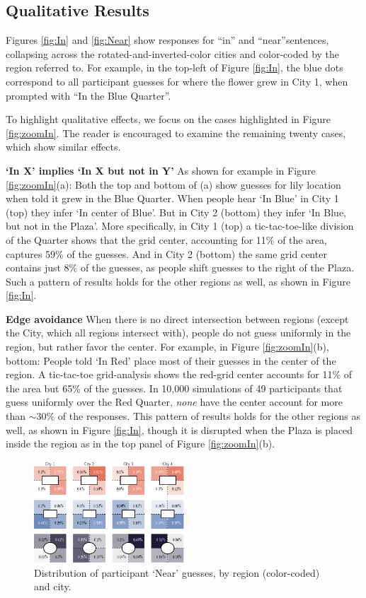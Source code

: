 \documentclass[10pt,letterpaper]{article}
\begin{document}
\subsection{Qualitative Results} 

Figures \ref{fig:In} and \ref{fig:Near} show responses for ``in'' and ``near''sentences, collapsing across the rotated-and-inverted-color cities and color-coded by the region referred to. For example, in the top-left of Figure \ref{fig:In}, the blue dots correspond to all participant guesses for where the flower grew in City 1, when prompted with ``In the Blue Quarter''. 

To highlight qualitative effects, we focus on the cases highlighted in Figure \ref{fig:zoomIn}. The reader is encouraged to examine the remaining twenty cases, which show similar effects. 

\textbf{`In X' implies `In X but not in Y'} As shown for example in Figure \ref{fig:zoomIn}(a): Both the top and bottom of (a) show guesses for lily location when told it grew in the Blue Quarter. When people hear `In Blue' in City 1 (top) they infer `In center of Blue'. But in City 2 (bottom) they infer `In Blue, but not in the Plaza'. More specifically, in City 1 (top) a tic-tac-toe-like division of the Quarter shows that the grid center, accounting for 11\% of the area, captures 59\% of the guesses. And in City 2 (bottom) the same grid center contains just 8\% of the guesses, as people shift guesses to the right of the Plaza. Such a pattern of results holds for the other regions as well, as shown in Figure \ref{fig:In}. 

\textbf{Edge avoidance} When there is no direct intersection between regions (except the City, which all regions intersect with), people do not guess uniformly in the region, but rather favor the center. For example, in Figure \ref{fig:zoomIn}(b), bottom: People told `In Red' place most of their guesses in the center of the region. A tic-tac-toe grid-analysis shows the red-grid center accounts for 11\% of the area but 65\% of the guesses. In 10,000 simulations of 49 participants that guess uniformly over the Red Quarter,  \textit{none} have the center account for more than $\sim$30\% of the responses. This pattern of results holds for the other regions as well, as shown in Figure \ref{fig:In}, though it is disrupted when the Plaza is placed inside the region as in the top panel of Figure \ref{fig:zoomIn}(b). 

\begin{figure}[!b]
\center
\includegraphics[width=0.5\textwidth]{figures/nearByQuad.png}
\caption{Distribution of participant `Near' guesses, by region (color-coded) and city.}
\label{fig:nearByQuad}
\end{figure}
\end{document}
